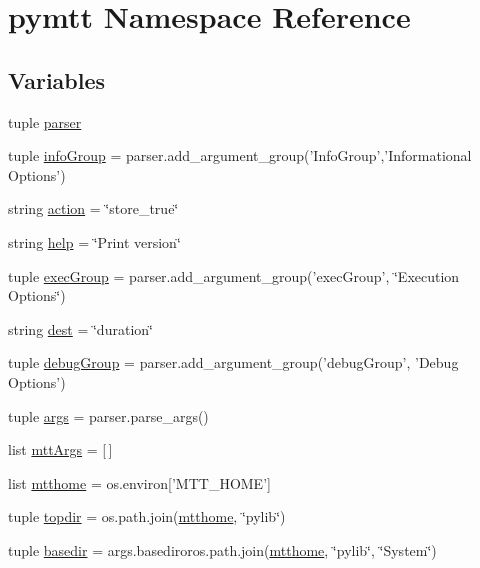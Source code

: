 \hypertarget{namespacepymtt}{\section{pymtt Namespace Reference}
\label{namespacepymtt}
}
\subsection*{Variables}
\begin{DoxyCompactItemize}
\item 
tuple \hyperlink{namespacepymtt_a95d54fdad48aac280be9d57cf81dee68}{parser}
\item 
tuple \hyperlink{namespacepymtt_a99ad2929ecc4e17f97670bed44f08c35}{info\-Group} = parser.\-add\-\_\-argument\-\_\-group('Info\-Group','Informational Options')
\item 
string \hyperlink{namespacepymtt_a5ee564a034624d925bb8dc823d11c522}{action} = \char`\"{}store\-\_\-true\char`\"{}
\item 
string \hyperlink{namespacepymtt_a21e88c39af91deb569da20633d245b09}{help} = \char`\"{}Print version\char`\"{}
\item 
tuple \hyperlink{namespacepymtt_a0f52dbd5d46583e466305a708dea64a1}{exec\-Group} = parser.\-add\-\_\-argument\-\_\-group('exec\-Group', \char`\"{}Execution Options\char`\"{})
\item 
string \hyperlink{namespacepymtt_a9ecea46ee6082edb9bbdd8393829e18e}{dest} = \char`\"{}duration\char`\"{}
\item 
tuple \hyperlink{namespacepymtt_af066a010075617c13a5595243ceb9041}{debug\-Group} = parser.\-add\-\_\-argument\-\_\-group('debug\-Group', 'Debug Options')
\item 
tuple \hyperlink{namespacepymtt_af7633cc372f3357c4f8e6f8dedfe7a8e}{args} = parser.\-parse\-\_\-args()
\item 
list \hyperlink{namespacepymtt_a7dea31bd26744bab0b1c30dc11c718aa}{mtt\-Args} = \mbox{[}$\,$\mbox{]}
\item 
list \hyperlink{namespacepymtt_a109ef76f074b08666398bf6a38219cfc}{mtthome} = os.\-environ\mbox{[}'M\-T\-T\-\_\-\-H\-O\-M\-E'\mbox{]}
\item 
tuple \hyperlink{namespacepymtt_ac673c895b8c93a029d2a1655c04af315}{topdir} = os.\-path.\-join(\hyperlink{namespacepymtt_a109ef76f074b08666398bf6a38219cfc}{mtthome}, \char`\"{}pylib\char`\"{})
\item 
tuple \hyperlink{namespacepymtt_a57729393cfbd99464570d7fa5ad9fa05}{basedir} = args.\-basediroros.\-path.\-join(\hyperlink{namespacepymtt_a109ef76f074b08666398bf6a38219cfc}{mtthome}, \char`\"{}pylib\char`\"{}, \char`\"{}System\char`\"{})

\end{DoxyCompactItemize}
